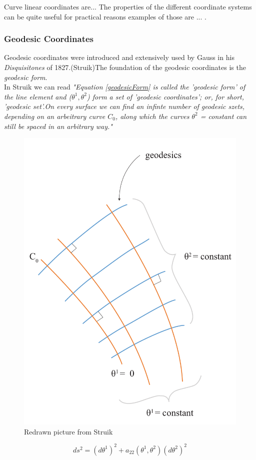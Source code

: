 Curve linear coordinates are... The properties of the different coordinate systems can be quite useful for practical reasons examples of those are ... .  

\subsubsection{Geodesic Coordinates}

Geodesic coordinates were introduced and extensively used by Gauss in his \textit{Disquisitones} of 1827.(Struik)The foundation of the geodesic coordinates is the  \textit{geodesic form}.\\ 
In Struik we can read \textit{"Equation \ref{geodesicForm} is called the 'geodesic form' of the line element and ($\theta^1,\theta^2$) form a set of 'geodesic coordinates'; or, for short, 'geodesic set'.On every surface we can find an infinte number of geodesic szets, depending on an arbeitrary curve $C_0$, along which the curves $\theta^2$ = constant can still be spaced in an arbitrary way."}\\

\begin{figure}[H]
\centering
\includegraphics[height=0.8\linewidth ]{figure/Theory/geodesicCoordRe.pdf}
\caption{Redrawn picture from Struik }
\end{figure}


\begin{equation}\label{geodesicForm}
    ds^2 = (d\theta^1)^2 + a_{22}(\theta^1,\theta^2)(d\theta^2)^2
\end{equation}


